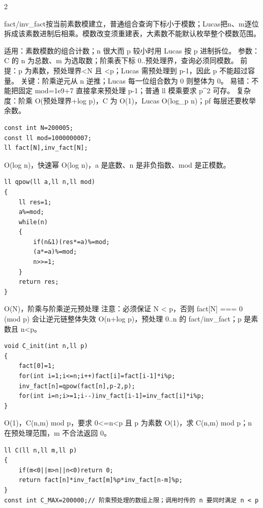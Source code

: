 \documentclass[UTF8,fontset=fandol,a4paper,twoside]{ctexart}
\newcommand{\note}[1]{{\fontsize{10}{12}\selectfont #1\par}}
\begin{document}
\begin{multicols}{2}
\note{fact/\allowbreak{}inv\_fact按当前素数模建立，普通组合查询下标小于模数；Lucas把n、m逐位拆成该素数进制后相乘。模数改变须重建表，大素数不能默认枚举整个模数范围。}
\note{适用：素数模数的组合计数；n 很大而 p 较小时用 Lucas 按 p 进制拆位。 参数：C 的 n 为总数、m 为选取数；阶乘表下标 0.\allowbreak{}.\allowbreak{}预处理界，查询必须同模数。 前提：p 为素数，预处理界<\allowbreak{}N 且 <\allowbreak{}p；Lucas 需预处理到 p-\allowbreak{}1，因此 p 不能超过容量。 关键：阶乘逆元从 n 逆推；Lucas 每一位组合数为 0 则整体为 0。 易错：不能把固定 mod=\allowbreak{}1e9+\allowbreak{}7 直接拿来预处理 p-\allowbreak{}1；普通 ll 模乘要求 p\textasciicircum{}2 可存。 复杂度：阶乘 O(\allowbreak{}预处理界+\allowbreak{}log p)\allowbreak{}，C 为 O(\allowbreak{}1)\allowbreak{}，Lucas O(\allowbreak{}log\_p n)\allowbreak{}；pf 每层还要枚举余数。}
\begin{lstlisting}
const int N=200005;
const ll mod=1000000007;
ll fact[N],inv_fact[N];
\end{lstlisting}
\note{O(\allowbreak{}log n)\allowbreak{}，快速幂 O(\allowbreak{}log n)\allowbreak{}，a 是底数、n 是非负指数、mod 是正模数。}
\begin{lstlisting}
ll qpow(ll a,ll n,ll mod)
{
    ll res=1;
    a%=mod;
    while(n)
    {
        if(n&1)(res*=a)%=mod;
        (a*=a)%=mod;
        n>>=1;
    }
    return res;
}
\end{lstlisting}
\note{O(\allowbreak{}N)\allowbreak{}，阶乘与阶乘逆元预处理 注意：必须保证 N <\allowbreak{} p，否则 fact[\allowbreak{}N]\allowbreak{} =\allowbreak{}=\allowbreak{}=\allowbreak{} 0 (\allowbreak{}mod p)\allowbreak{} 会让逆元链整体失效 O(\allowbreak{}n+\allowbreak{}log p)\allowbreak{}，预处理 0.\allowbreak{}.\allowbreak{}n 的 fact/\allowbreak{}inv\_fact；p 是素数且 n<\allowbreak{}p。}
\begin{lstlisting}
void C_init(int n,ll p)
{
    fact[0]=1;
    for(int i=1;i<=n;i++)fact[i]=fact[i-1]*i%p;
    inv_fact[n]=qpow(fact[n],p-2,p);
    for(int i=n;i>=1;i--)inv_fact[i-1]=inv_fact[i]*i%p;
}
\end{lstlisting}
\note{O(\allowbreak{}1)\allowbreak{}，C(\allowbreak{}n,\allowbreak{}m)\allowbreak{} mod p，要求 0<\allowbreak{}=\allowbreak{}n<\allowbreak{}p 且 p 为素数 O(\allowbreak{}1)\allowbreak{}，求 C(\allowbreak{}n,\allowbreak{}m)\allowbreak{} mod p；n 在预处理范围，m 不合法返回 0。}
\begin{lstlisting}
ll C(ll n,ll m,ll p)
{
    if(m<0||m>n||n<0)return 0;
    return fact[n]*inv_fact[m]%p*inv_fact[n-m]%p;
}
const int C_MAX=200000;// 阶乘预处理的数组上限；调用时传的 n 要同时满足 n < p

\end{lstlisting}
\end{multicols}
\end{document}
